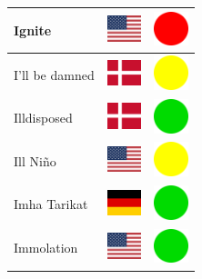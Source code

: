 \documentclass[12pt, a4paper, twoside]{report}
\begin{document}
\begin{center}
\begin{longtable}{|p{5cm}|p{2cm}|p{2cm}|}
 Ignite                                                     & \includegraphics[width=1cm]{../4x3/us} &   \includegraphics[width=1cm]{../likes/n} \\ \hline
 I'll be damned                                             & \includegraphics[width=1cm]{../4x3/dk} &   \includegraphics[width=1cm]{../likes/m} \\ \hline
 Illdisposed                                                & \includegraphics[width=1cm]{../4x3/dk} &   \includegraphics[width=1cm]{../likes/y} \\ \hline
 Ill Niño                                                   & \includegraphics[width=1cm]{../4x3/us} &   \includegraphics[width=1cm]{../likes/m} \\ \hline
 Imha Tarikat                                               & \includegraphics[width=1cm]{../4x3/de} &   \includegraphics[width=1cm]{../likes/y} \\ \hline
 Immolation                                                 & \includegraphics[width=1cm]{../4x3/us} &   \includegraphics[width=1cm]{../likes/y} \\ \hline

\end{longtable}
\end{center}
\end{document}
